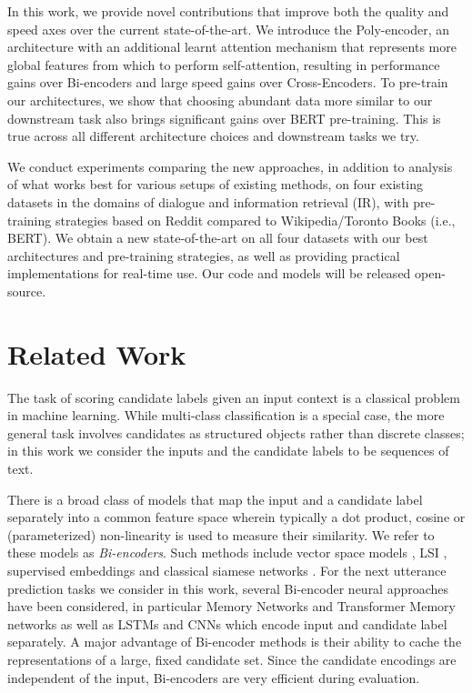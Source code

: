 \documentclass{article} \usepackage{iclr2020_conference,times}
\begin{document}
In this work, we provide novel contributions that improve both the quality and speed axes over the current  state-of-the-art.
We introduce the Poly-encoder, an architecture with an additional learnt attention mechanism that represents more global features from which to perform self-attention, resulting in performance gains over Bi-encoders and large speed gains over Cross-Encoders.
To pre-train our architectures, we show that choosing abundant data more similar to our downstream task also brings significant gains over BERT pre-training.  This is true across all different architecture choices and downstream tasks we try.


We conduct experiments comparing the new approaches, in addition to analysis of what works best for various setups of existing methods, 
on four existing datasets in the domains of dialogue and 
information retrieval (IR),
with pre-training strategies based on  Reddit \citep{training_millions} compared to Wikipedia/Toronto Books (i.e., BERT). 
We obtain a new state-of-the-art  on all four datasets with our best architectures and pre-training strategies, as well as providing practical implementations for real-time use.
Our code and models will be released open-source. 



\section{Related Work}

The task of scoring candidate labels given an input context is a classical
problem in machine learning. 
While multi-class classification is a special case,
the more general task involves candidates as structured objects
rather than discrete classes; in this work we consider the inputs and the candidate labels to be sequences of text. 

There is a broad class of models that map the input and a candidate label separately into a common feature space wherein typically a dot product, cosine or (parameterized) non-linearity is used to measure their similarity.  
We refer to these models as  {\em Bi-encoders}.
Such methods include vector space models \citep{salton1975vector},
LSI \citep{deerwester1990indexing},
supervised embeddings \citep{bai2009supervised,wu2018starspace} and classical siamese networks \citep{bromley1994signature}.
For the next utterance prediction tasks we consider in this work, several Bi-encoder neural approaches have been considered, in particular Memory Networks \citep{zhang2018personalizing} and Transformer Memory networks \citep{dinan2019wizard}
as well as LSTMs \citep{lowe2015ubuntu} and CNNs \citep{kadlec2015improved} which encode input and 
candidate label separately.
A major advantage of Bi-encoder methods 
is their ability to cache the representations of a large, fixed candidate set. Since the candidate encodings are independent of the input, Bi-encoders are very efficient during evaluation.
\end{document}
